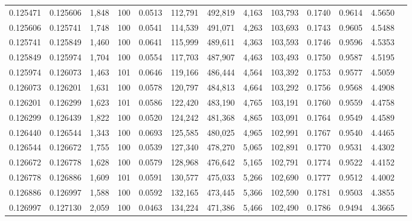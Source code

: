 \begin{tabular}{rrrrrrrrrrrrr}
0.125471 & 0.125606 & 1,848 & 100 &                                     0.0513 & 112,791 & 492,819 &   4,163 & 103,793 & 0.1740 & 0.9614 & 4.5650 \\
0.125606 & 0.125741 & 1,748 & 100 &                                     0.0541 & 114,539 & 491,071 &   4,263 & 103,693 & 0.1743 & 0.9605 & 4.5488 \\
0.125741 & 0.125849 & 1,460 & 100 &                                     0.0641 & 115,999 & 489,611 &   4,363 & 103,593 & 0.1746 & 0.9596 & 4.5353 \\
0.125849 & 0.125974 & 1,704 & 100 &                                     0.0554 & 117,703 & 487,907 &   4,463 & 103,493 & 0.1750 & 0.9587 & 4.5195 \\
0.125974 & 0.126073 & 1,463 & 101 &                                     0.0646 & 119,166 & 486,444 &   4,564 & 103,392 & 0.1753 & 0.9577 & 4.5059 \\
0.126073 & 0.126201 & 1,631 & 100 &                                     0.0578 & 120,797 & 484,813 &   4,664 & 103,292 & 0.1756 & 0.9568 & 4.4908 \\
0.126201 & 0.126299 & 1,623 & 101 &                                     0.0586 & 122,420 & 483,190 &   4,765 & 103,191 & 0.1760 & 0.9559 & 4.4758 \\
0.126299 & 0.126439 & 1,822 & 100 &                                     0.0520 & 124,242 & 481,368 &   4,865 & 103,091 & 0.1764 & 0.9549 & 4.4589 \\
0.126440 & 0.126544 & 1,343 & 100 &                                     0.0693 & 125,585 & 480,025 &   4,965 & 102,991 & 0.1767 & 0.9540 & 4.4465 \\
0.126544 & 0.126672 & 1,755 & 100 &                                     0.0539 & 127,340 & 478,270 &   5,065 & 102,891 & 0.1770 & 0.9531 & 4.4302 \\
0.126672 & 0.126778 & 1,628 & 100 &                                     0.0579 & 128,968 & 476,642 &   5,165 & 102,791 & 0.1774 & 0.9522 & 4.4152 \\
0.126778 & 0.126886 & 1,609 & 101 &                                     0.0591 & 130,577 & 475,033 &   5,266 & 102,690 & 0.1777 & 0.9512 & 4.4002 \\
0.126886 & 0.126997 & 1,588 & 100 &                                     0.0592 & 132,165 & 473,445 &   5,366 & 102,590 & 0.1781 & 0.9503 & 4.3855 \\
0.126997 & 0.127130 & 2,059 & 100 &                                     0.0463 & 134,224 & 471,386 &   5,466 & 102,490 & 0.1786 & 0.9494 & 4.3665 \\

\end{tabular}

